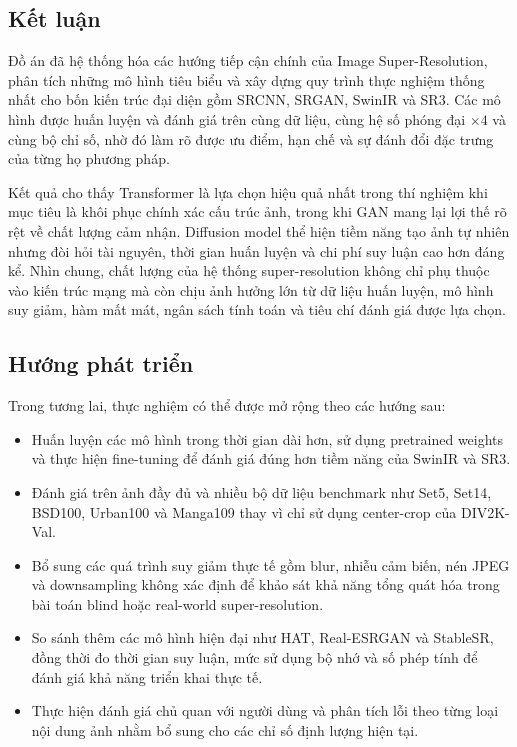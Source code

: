 \subsection{Kết luận}

Đồ án đã hệ thống hóa các hướng tiếp cận chính của Image Super-Resolution, phân
tích những mô hình tiêu biểu và xây dựng quy trình thực nghiệm thống nhất cho
bốn kiến trúc đại diện gồm SRCNN, SRGAN, SwinIR và SR3. Các mô hình được huấn
luyện và đánh giá trên cùng dữ liệu, cùng hệ số phóng đại $\times 4$ và cùng bộ
chỉ số, nhờ đó làm rõ được ưu điểm, hạn chế và sự đánh đổi đặc trưng của từng họ
phương pháp.

Kết quả cho thấy Transformer là lựa chọn hiệu quả nhất trong thí nghiệm khi mục
tiêu là khôi phục chính xác cấu trúc ảnh, trong khi GAN mang lại lợi thế rõ rệt
về chất lượng cảm nhận. Diffusion model thể hiện tiềm năng tạo ảnh tự nhiên
nhưng đòi hỏi tài nguyên, thời gian huấn luyện và chi phí suy luận cao hơn đáng
kể. Nhìn chung, chất lượng của hệ thống super-resolution không chỉ phụ thuộc vào
kiến trúc mạng mà còn chịu ảnh hưởng lớn từ dữ liệu huấn luyện, mô hình suy giảm,
hàm mất mát, ngân sách tính toán và tiêu chí đánh giá được lựa chọn.

\subsection{Hướng phát triển}

Trong tương lai, thực nghiệm có thể được mở rộng theo các hướng sau:

\begin{itemize}
\item Huấn luyện các mô hình trong thời gian dài hơn, sử dụng pretrained weights
      và thực hiện fine-tuning để đánh giá đúng hơn tiềm năng của SwinIR và SR3.
\item Đánh giá trên ảnh đầy đủ và nhiều bộ dữ liệu benchmark như Set5, Set14,
      BSD100, Urban100 và Manga109 thay vì chỉ sử dụng center-crop của DIV2K-Val.
\item Bổ sung các quá trình suy giảm thực tế gồm blur, nhiễu cảm biến, nén JPEG
      và downsampling không xác định để khảo sát khả năng tổng quát hóa trong
      bài toán blind hoặc real-world super-resolution.
\item So sánh thêm các mô hình hiện đại như HAT, Real-ESRGAN và StableSR, đồng
      thời đo thời gian suy luận, mức sử dụng bộ nhớ và số phép tính để đánh giá
      khả năng triển khai thực tế.
\item Thực hiện đánh giá chủ quan với người dùng và phân tích lỗi theo từng loại
      nội dung ảnh nhằm bổ sung cho các chỉ số định lượng hiện tại.
\end{itemize}
